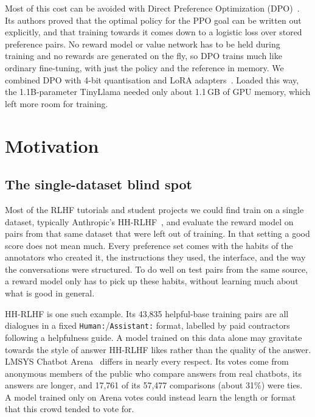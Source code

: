 Most of this cost can be avoided with Direct Preference Optimization (DPO)~\cite{rafailov2023dpo}. Its authors proved that the optimal policy for the PPO goal can be written out explicitly, and that training towards it comes down to a logistic loss over stored preference pairs. No reward model or value network has to be held during training and no rewards are generated on the fly, so DPO trains much like ordinary fine-tuning, with just the policy and the reference in memory. We combined DPO with 4-bit quantisation and LoRA adapters~\cite{hu2022lora,dettmers2023qlora}. Loaded this way, the 1.1B-parameter TinyLlama needed only about 1.1\,GB of GPU memory, which left more room for training.

\section{Motivation}
\label{sec:motivation}

\subsection{The single-dataset blind spot}
Most of the RLHF tutorials and student projects we could find train on a single dataset, typically Anthropic's HH-RLHF~\cite{bai2022hh}, and evaluate the reward model on pairs from that same dataset that were left out of training. In that setting a good score does not mean much. Every preference set comes with the habits of the annotators who created it, the instructions they used, the interface, and the way the conversations were structured. To do well on test pairs from the same source, a reward model only has to pick up these habits, without learning much about what is good in general.

HH-RLHF is one such example. Its 43,835 helpful-base training pairs are all dialogues in a fixed \texttt{Human:}/\texttt{Assistant:} format, labelled by paid contractors following a helpfulness guide. A model trained on this data alone may gravitate towards the style of answer HH-RLHF likes rather than the quality of the answer. LMSYS Chatbot Arena~\cite{chiang2024arena} differs in nearly every respect. Its votes come from anonymous members of the public who compare answers from real chatbots, its answers are longer, and 17,761 of its 57,477 comparisons (about 31\%) were ties. A model trained only on Arena votes could instead learn the length or format that this crowd tended to vote for.

